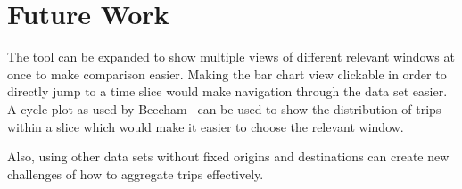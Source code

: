 \section{Future Work}
The tool can be expanded to show multiple views of different
relevant windows at once to make comparison easier.
Making the bar chart view clickable in order to directly jump to
a time slice would make navigation through the data set easier.
A cycle plot as used by Beecham~\etal\cite{Beecham2012}
can be used to show the distribution of trips within a slice
which would make it easier to choose the relevant window.

Also, using other data sets without fixed origins and destinations
can create new challenges of how to aggregate trips
effectively.
